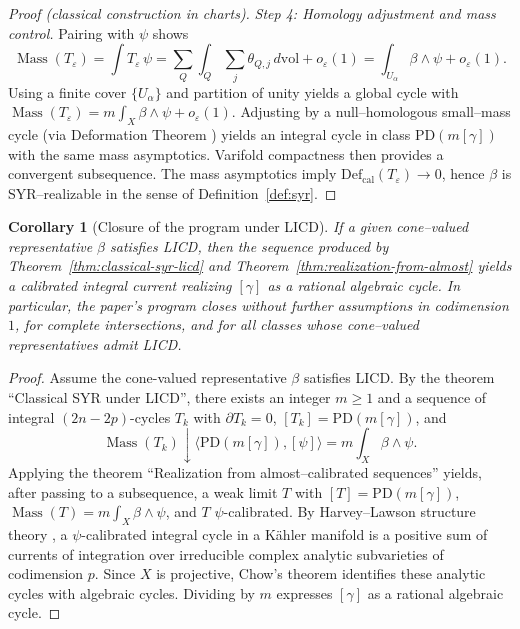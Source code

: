 \documentclass[11pt]{article}
\newcommand{\REVMZ}[1]{\textcolor{teal}{#1}}  %
\numberwithin{equation}{section}  %
\theoremstyle{plain}
\newtheorem{corollary}[theorem]{Corollary}
\theoremstyle{definition}
\theoremstyle{remark}
\newcommand{\vol}{\mathrm{vol}}
\DeclareMathOperator{\Mass}{Mass}
\newcommand{\Def}{\mathrm{Def}}
\begin{document}
\begin{proof}[Proof (classical construction in charts)]
	\emph{Step 4: Homology adjustment and mass control.} Pairing with $\psi$ shows
	\[
	\Mass(T_\varepsilon)=\int T_\varepsilon\,\psi
	= \sum_Q \int_Q \sum_j \theta_{Q,j}\,d\vol + o_\varepsilon(1)
	= \int_{U_\alpha}\beta\wedge\psi + o_\varepsilon(1).
	\]
	Using a finite cover $\{U_\alpha\}$ and partition of unity yields a global cycle
	with $\Mass(T_\varepsilon)=m\int_X\beta\wedge\psi + o_\varepsilon(1)$. Adjusting
	by a null--homologous small--mass cycle (via Deformation Theorem \cite{FF60,Fed69}) yields an integral
	cycle in class $\mathrm{PD}(m[\gamma])$ with the same mass asymptotics. Varifold
	compactness then provides a convergent subsequence.  The mass asymptotics imply
	$\Def_{\mathrm{cal}}(T_\varepsilon)\to 0$, hence $\beta$ is SYR--realizable in the
	sense of Definition~\ref{def:syr}.
\end{proof}

\begin{corollary}[Closure of the program under LICD]\label{cor:closure-licd}
	If a given cone--valued representative $\beta$ satisfies LICD, then the sequence produced by Theorem~\ref{thm:classical-syr-licd}
	and Theorem~\ref{thm:realization-from-almost} yields a calibrated integral current
	realizing $[\gamma]$ as a rational algebraic cycle. In particular, the paper's
	program closes without further assumptions in codimension $1$, for complete intersections,
	and for all classes whose cone--valued representatives admit LICD.
\end{corollary}
\begin{proof}
Assume the cone-valued representative $\beta$ satisfies LICD.
By the theorem ``Classical SYR under LICD'', there exists an integer $m\ge 1$ and a sequence of integral $(2n-2p)$-cycles $T_k$
with $\partial T_k=0$, $[T_k]=\mathrm{PD}(m[\gamma])$, and
\[
\Mass(T_k)\downarrow \bigl\langle \mathrm{PD}(m[\gamma]),[\psi]\bigr\rangle
= m\int_X \beta\wedge\psi.
\]
Applying the theorem ``Realization from almost--calibrated sequences'' yields, after passing to a subsequence, a weak limit $T$
with $[T]=\mathrm{PD}(m[\gamma])$, $\Mass(T)=m\int_X \beta\wedge\psi$, and $T$ $\psi$-calibrated.
By Harvey--Lawson
 structure theory \REVMZ{\cite{HL82}}, a $\psi$-calibrated integral cycle in a K\"ahler manifold is a positive sum of currents of integration
over irreducible complex analytic subvarieties of codimension $p$.
Since $X$ is projective, Chow's theorem \REVMZ{\cite{Chow49}}
 identifies these analytic cycles with algebraic cycles.
Dividing by $m$ expresses $[\gamma]$ as a rational algebraic cycle.
\end{proof}
\end{document}
